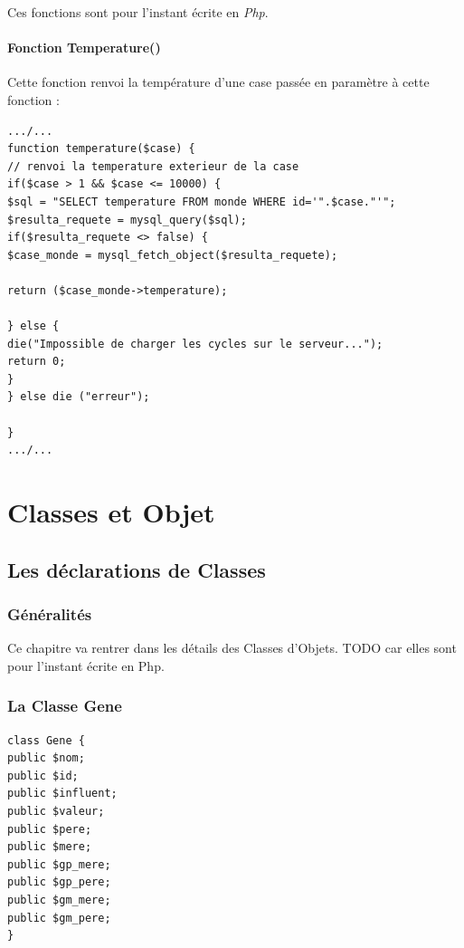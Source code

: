 \documentclass[french]{report}
\begin{document}
Ces fonctions sont pour l'instant écrite en \textit{Php}.

\subsection{Fonction Temperature()}
Cette fonction renvoi la température d'une case passée en paramètre à cette fonction : \\

\begin{lstlisting}[frame=single,caption={monde.php}]
.../...
function temperature($case) {
// renvoi la temperature exterieur de la case
if($case > 1 && $case <= 10000) {
$sql = "SELECT temperature FROM monde WHERE id='".$case."'";
$resulta_requete = mysql_query($sql);
if($resulta_requete <> false) {
$case_monde = mysql_fetch_object($resulta_requete);

return ($case_monde->temperature);

} else {
die("Impossible de charger les cycles sur le serveur...");
return 0;
}
} else die ("erreur");

}
.../...
\end{lstlisting}


\newpage
\part{Classes et Objet} \label{classes}
\chapter{Les déclarations de Classes}\label{declaration_classes}
\section{Généralités}
Ce chapitre va rentrer dans les détails des Classes d'Objets.
TODO car elles sont pour l'instant écrite en Php.\\

\section{La Classe Gene }\label{classe_gene}
\begin{lstlisting}[frame=single,caption={Classe Gene}]
class Gene {
public $nom;
public $id;
public $influent;
public $valeur;
public $pere;
public $mere;
public $gp_mere;
public $gp_pere;
public $gm_mere;
public $gm_pere;
}
\end{lstlisting}
\end{document}

